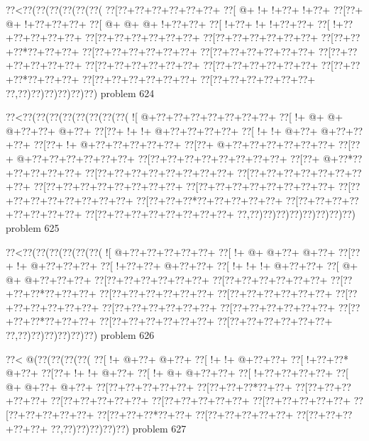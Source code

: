 \vbox{\vbox{\goo
\0??<\0??(\0??(\0??(\0??(\0??(\0??(
\0??[\0??+\0??+\0??+\0??+\0??+\0??+
\0??[\- @+\- !+\- !+\0??+\- !+\0??+
\0??[\0??+\- @+\- !+\0??+\0??+\0??+
\0??[\- @+\- @+\- @+\- !+\0??+\0??+
\0??[\- !+\0??+\- !+\- !+\0??+\0??+
\0??[\- !+\0??+\0??+\0??+\0??+\0??+
\0??[\0??+\0??+\0??+\0??+\0??+\0??+
\0??[\0??+\0??+\0??+\0??+\0??+\0??+
\0??[\0??+\0??+\0??*\0??+\0??+\0??+
\0??[\0??+\0??+\0??+\0??+\0??+\0??+
\0??[\0??+\0??+\0??+\0??+\0??+\0??+
\0??[\0??+\0??+\0??+\0??+\0??+\0??+
\0??[\0??+\0??+\0??+\0??+\0??+\0??+
\0??[\0??+\0??+\0??+\0??+\0??+\0??+
\0??[\0??+\0??+\0??*\0??+\0??+\0??+
\0??[\0??+\0??+\0??+\0??+\0??+\0??+
\0??[\0??+\0??+\0??+\0??+\0??+\0??+
\0??,\0??)\0??)\0??)\0??)\0??)\0??)
}
\hfil problem 624\hfil\break
}

\vbox{\vbox{\goo
\0??<\0??(\0??(\0??(\0??(\0??(\0??(\0??(\0??(
\- ![\- @+\0??+\0??+\0??+\0??+\0??+\0??+\0??+
\0??[\- !+\- @+\- @+\- @+\0??+\0??+\- @+\0??+
\0??[\0??+\- !+\- !+\- @+\0??+\0??+\0??+\0??+
\0??[\- !+\- !+\- @+\0??+\- @+\0??+\0??+\0??+
\0??[\0??+\- !+\- @+\0??+\0??+\0??+\0??+\0??+
\0??[\0??+\- @+\0??+\0??+\0??+\0??+\0??+\0??+
\0??[\0??+\- @+\0??+\0??+\0??+\0??+\0??+\0??+
\0??[\0??+\0??+\0??+\0??+\0??+\0??+\0??+\0??+
\0??[\0??+\- @+\0??*\0??+\0??+\0??+\0??+\0??+
\0??[\0??+\0??+\0??+\0??+\0??+\0??+\0??+\0??+
\0??[\0??+\0??+\0??+\0??+\0??+\0??+\0??+\0??+
\0??[\0??+\0??+\0??+\0??+\0??+\0??+\0??+\0??+
\0??[\0??+\0??+\0??+\0??+\0??+\0??+\0??+\0??+
\0??[\0??+\0??+\0??+\0??+\0??+\0??+\0??+\0??+
\0??[\0??+\0??+\0??*\0??+\0??+\0??+\0??+\0??+
\0??[\0??+\0??+\0??+\0??+\0??+\0??+\0??+\0??+
\0??[\0??+\0??+\0??+\0??+\0??+\0??+\0??+\0??+
\0??,\0??)\0??)\0??)\0??)\0??)\0??)\0??)\0??)
}
\hfil problem 625\hfil\break
}

\vbox{\vbox{\goo
\0??<\0??(\0??(\0??(\0??(\0??(\0??(
\- ![\- @+\0??+\0??+\0??+\0??+\0??+
\0??[\- !+\- @+\- @+\0??+\- @+\0??+
\0??[\0??+\- !+\- @+\0??+\0??+\0??+
\0??[\- !+\0??+\0??+\- @+\0??+\0??+
\0??[\- !+\- !+\- !+\- @+\0??+\0??+
\0??[\- @+\- @+\- @+\0??+\0??+\0??+
\0??[\0??+\0??+\0??+\0??+\0??+\0??+
\0??[\0??+\0??+\0??+\0??+\0??+\0??+
\0??[\0??+\0??+\0??*\0??+\0??+\0??+
\0??[\0??+\0??+\0??+\0??+\0??+\0??+
\0??[\0??+\0??+\0??+\0??+\0??+\0??+
\0??[\0??+\0??+\0??+\0??+\0??+\0??+
\0??[\0??+\0??+\0??+\0??+\0??+\0??+
\0??[\0??+\0??+\0??+\0??+\0??+\0??+
\0??[\0??+\0??+\0??*\0??+\0??+\0??+
\0??[\0??+\0??+\0??+\0??+\0??+\0??+
\0??[\0??+\0??+\0??+\0??+\0??+\0??+
\0??,\0??)\0??)\0??)\0??)\0??)\0??)
}
\hfil problem 626\hfil\break
}

\vbox{\vbox{\goo
\0??<\- @(\0??(\0??(\0??(\0??(
\0??[\- !+\- @+\0??+\- @+\0??+
\0??[\- !+\- !+\- @+\0??+\0??+
\0??[\- !+\0??+\0??*\- @+\0??+
\0??[\0??+\- !+\- !+\- @+\0??+
\0??[\- !+\- @+\- @+\0??+\0??+
\0??[\- !+\0??+\0??+\0??+\0??+
\0??[\- @+\- @+\0??+\- @+\0??+
\0??[\0??+\0??+\0??+\0??+\0??+
\0??[\0??+\0??+\0??*\0??+\0??+
\0??[\0??+\0??+\0??+\0??+\0??+
\0??[\0??+\0??+\0??+\0??+\0??+
\0??[\0??+\0??+\0??+\0??+\0??+
\0??[\0??+\0??+\0??+\0??+\0??+
\0??[\0??+\0??+\0??+\0??+\0??+
\0??[\0??+\0??+\0??*\0??+\0??+
\0??[\0??+\0??+\0??+\0??+\0??+
\0??[\0??+\0??+\0??+\0??+\0??+
\0??,\0??)\0??)\0??)\0??)\0??)
}
\hfil problem 627\hfil\break
}

